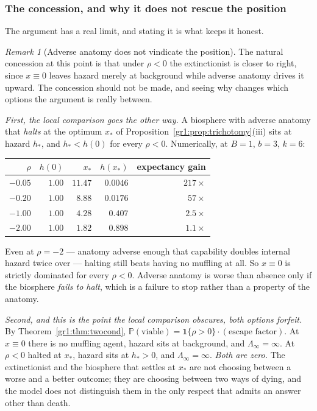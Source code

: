 \documentclass[11pt]{article}
\numberwithin{equation}{section}
\theoremstyle{plain}
\theoremstyle{definition}
\theoremstyle{remark}
\newtheorem{remark}[theorem]{Remark}
\newcommand{\PP}{\mathbb{P}}
\newcommand{\one}{\mathbf{1}}
\begin{document}
\subsubsection{The concession, and why it does not rescue the position}
\label{hr:subsub:concession}

The argument has a real limit, and stating it is what keeps it honest.

\begin{remark}[Adverse anatomy does not vindicate the position]
\label{hr:rem:concession}
The natural concession at this point is that under $\rho<0$ the
extinctionist is closer to right, since $x\equiv0$ leaves hazard merely
at background while adverse anatomy drives it upward. The concession
should not be made, and seeing why changes which options the argument is
really between.

\emph{First, the local comparison goes the other way.} A biosphere with
adverse anatomy that \emph{halts} at the optimum $x_\ast$ of
Proposition~\ref{gr1:prop:trichotomy}(iii) sits at hazard $h_\ast$, and
$h_\ast<h(0)$ for every $\rho<0$. Numerically, at $B=1$, $b=3$, $k=6$:
\begin{center}\small
\begin{tabular}{@{}rrrrr@{}}
\toprule
$\rho$ & $h(0)$ & $x_\ast$ & $h(x_\ast)$ & expectancy gain\\
\midrule
$-0.05$ & $1.00$ & $11.47$ & $0.0046$ & $217\times$\\
$-0.20$ & $1.00$ & $8.88$ & $0.0176$ & $57\times$\\
$-1.00$ & $1.00$ & $4.28$ & $0.407$ & $2.5\times$\\
$-2.00$ & $1.00$ & $1.82$ & $0.898$ & $1.1\times$\\
\bottomrule
\end{tabular}
\end{center}
Even at $\rho=-2$ --- anatomy adverse enough that capability doubles
internal hazard twice over --- halting still beats having no muffling at
all. So $x\equiv0$ is strictly dominated for every $\rho<0$. Adverse
anatomy is worse than absence only if the biosphere \emph{fails to
halt}, which is a failure to stop rather than a property of the anatomy.

\emph{Second, and this is the point the local comparison obscures, both
options forfeit.} By Theorem~\ref{gr1:thm:twocond},
$\PP(\text{viable})=\one\{\rho>0\}\cdot(\text{escape factor})$. At
$x\equiv0$ there is no muffling agent, hazard sits at background, and
$\Lambda_\infty=\infty$. At $\rho<0$ halted at $x_\ast$, hazard sits at
$h_\ast>0$, and $\Lambda_\infty=\infty$. \emph{Both are zero.} The
extinctionist and the biosphere that settles at $x_\ast$ are not
choosing between a worse and a better outcome; they are choosing between
two ways of dying, and the model does not distinguish them in the only
respect that admits an answer other than death.


\end{remark}
\end{document}
